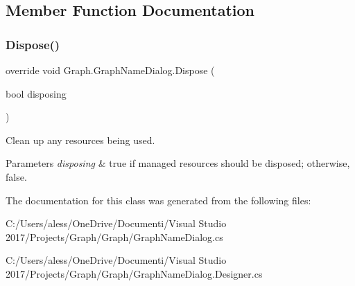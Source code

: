 \subsection{Member Function Documentation}
\mbox{\label{class_graph_1_1_graph_name_dialog_a81b7a2704a245cf0cf74675f7bd01957}} 
\subsubsection{\texorpdfstring{Dispose()}{Dispose()}}
{\footnotesize\ttfamily override void Graph.\+Graph\+Name\+Dialog.\+Dispose (\begin{DoxyParamCaption}\item[{bool}]{disposing }\end{DoxyParamCaption})\hspace{0.3cm}{\ttfamily [protected]}}



Clean up any resources being used. 


\begin{DoxyParams}{Parameters}
{\em disposing} & true if managed resources should be disposed; otherwise, false.\\
\hline
\end{DoxyParams}


The documentation for this class was generated from the following files\+:\begin{DoxyCompactItemize}
\item 
C\+:/\+Users/aless/\+One\+Drive/\+Documenti/\+Visual Studio 2017/\+Projects/\+Graph/\+Graph/Graph\+Name\+Dialog.\+cs\item 
C\+:/\+Users/aless/\+One\+Drive/\+Documenti/\+Visual Studio 2017/\+Projects/\+Graph/\+Graph/Graph\+Name\+Dialog.\+Designer.\+cs\end{DoxyCompactItemize}
